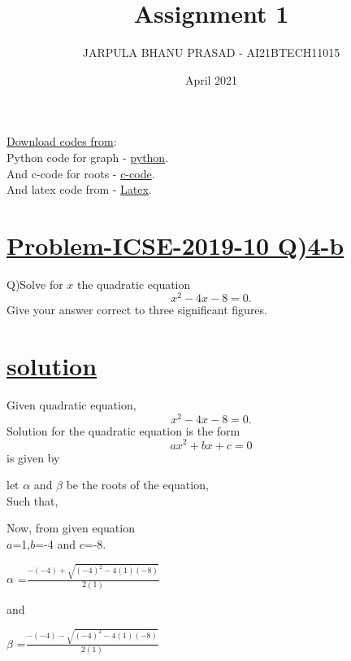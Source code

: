 \documentclass[journal,12pt,twocolumn]{IEEEtran}
\title{Assignment 1}
\author{JARPULA BHANU PRASAD - AI21BTECH11015	}
\date{April 2021}
\begin{document}
\maketitle
\Large \underline{Download codes from}:\\
\large Python code for graph - \href{https://github.com/jarpula-Bhanu/Assinment-1/blob/main/quardratic.py}{python}.\\And c-code for roots -  \href{https://github.com/jarpula-Bhanu/Assinment-1/blob/main/roots.c}{c-code}.\\And latex code from - \href{https://github.com/jarpula-Bhanu/Assinment-1/blob/main/Assignment_1.tex}{Latex}.

\section{\Large \underline{Problem-ICSE-2019-10  Q)4-b}}
\large \noindent Q)Solve for $x$ the quadratic equation $$x^2-4x-8=0.$$ Give your answer correct to three significant figures.
\section{\large \underline{solution}}
Given quadratic equation,
\large $$x^2-4x-8=0.$$
Solution for the quadratic equation is the form  \large $$ax^2+bx+c=0$$ is given by 
\begin{center}
\end{center}

let $\alpha$ and $\beta$ be the roots of the equation,\\Such that,
\begin{center}
\end{center}

Now, from given equation \\$a$=1,$b$=-4 and $c$=-8.
\begin{center}
$\alpha$ =\Large $\frac{-(-4)+\sqrt{(-4)^2-4(1)(-8)}}{2(1)}$
\end{center}
and
\begin{center}
$\beta$ =\Large $\frac{-(-4)-\sqrt{(-4)^2-4(1)(-8)}}{2(1)}$
\end{center}
\end{document}
